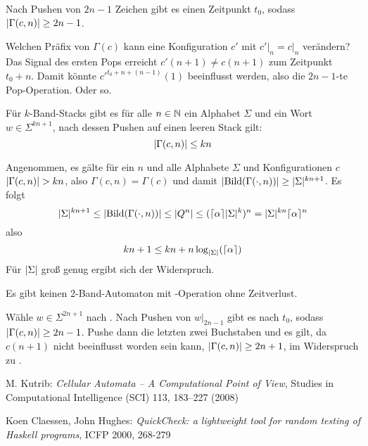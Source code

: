 \documentclass{article}
\begin{document}
\begin{satz}
    \label{thm:locontent}
    Nach Pushen von $2n-1$ Zeichen gibt es einen Zeitpunkt $t_0$, sodass $\lvert\Gamma(c,n)\rvert \geq 2n-1$.
    \begin{beweis}
        Welchen Präfix von $\Gamma(c)$ kann eine Konfiguration $c'$ mit $c' \big|_n = c \big|_n$ verändern? Das Signal des ersten Pops erreicht $c'(n+1) \neq c(n+1)$ zum Zeitpunkt $t_0+n$. Damit könnte $c'^{t_0+n+(n-1)}(1)$ beeinflusst werden, also die $2n-1$-te Pop-Operation. Oder so.
    \end{beweis}
\end{satz}

\begin{satz}
    \label{cor:spacesize}
    Für $k$-Band-Stacks gibt es für alle $n \in \mathbb{N}$ ein Alphabet $\Sigma$ und ein Wort $w \in \Sigma^{kn+1}$, nach dessen Pushen auf einen leeren Stack gilt:
    \[ \lvert\Gamma(c,n)\rvert \leq kn \]
    \begin{beweis}
        Angenommen, es gälte für ein $n$ und alle Alphabete $\Sigma$ und Konfigurationen $c$ $\lvert\Gamma(c,n)\rvert > kn$, also $\Gamma(c,n) = \Gamma(c)$ und damit $\lvert\text{Bild}(\Gamma(\cdot,n))\rvert \geq \lvert\Sigma\rvert^{kn+1}$.
        Es folgt
        \[ \lvert\Sigma\rvert^{kn+1} \leq \lvert\text{Bild}(\Gamma(\cdot,n))\rvert \leq \lvert Q^n\rvert \leq (\lceil\alpha\rceil\lvert\Sigma\rvert^k)^n = \lvert\Sigma\rvert^{kn} \lceil\alpha\rceil^n \]
        also
        \[ kn + 1 \leq kn + n \log_{\lvert\Sigma\rvert}(\lceil\alpha\rceil) \]
        Für $\lvert\Sigma\rvert$ groß genug ergibt sich der Widerspruch.
    \end{beweis}
\end{satz}

\begin{satz}
    Es gibt keinen 2-Band-Automaton mit \pop-Operation ohne Zeitverlust.
    \begin{beweis}
        Wähle $w \in \Sigma^{2n+1}$ nach . Nach Pushen von $w \big|_{2n-1}$ gibt es nach  $t_0$, sodass $\lvert\Gamma(c,n)\rvert \geq 2n-1$. Pushe dann die letzten zwei Buchstaben und es gilt, da $c(n+1)$ nicht beeinflusst worden sein kann, $\lvert\Gamma(c,n)\rvert \geq 2n+1$, im Widerspruch zu .
    \end{beweis}
\end{satz}

\newpage
\begin{thebibliography}{9}
        M. Kutrib: \emph{Cellular Automata – A Computational Point of View}, Studies in Computational Intelligence (SCI) 113, 183–227 (2008)

        Koen Claessen, John Hughes: \emph{QuickCheck: a lightweight tool for random testing of Haskell programs}, ICFP 2000, 268-279
\end{thebibliography}
\end{document}
